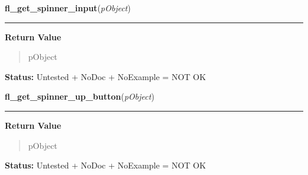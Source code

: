 \hspace{.8\funcindent}\begin{boxedminipage}{\funcwidth}

    \raggedright \textbf{fl\_get\_spinner\_input}(\textit{pObject})

    \vspace{-1.5ex}

    \rule{\textwidth}{0.5\fboxrule}
\setlength{\parskip}{2ex}
\setlength{\parskip}{1ex}
      \textbf{Return Value}
    \vspace{-1ex}

      \begin{quote}
      pObject

      \end{quote}

\textbf{Status:} Untested + NoDoc + NoExample = NOT OK



    \end{boxedminipage}

    \label{xformslib:library:fl_get_spinner_up_button}

    \vspace{0.5ex}

\hspace{.8\funcindent}\begin{boxedminipage}{\funcwidth}

    \raggedright \textbf{fl\_get\_spinner\_up\_button}(\textit{pObject})

    \vspace{-1.5ex}

    \rule{\textwidth}{0.5\fboxrule}
\setlength{\parskip}{2ex}
\setlength{\parskip}{1ex}
      \textbf{Return Value}
    \vspace{-1ex}

      \begin{quote}
      pObject

      \end{quote}

\textbf{Status:} Untested + NoDoc + NoExample = NOT OK



    \end{boxedminipage}

    \label{xformslib:library:fl_get_spinner_down_button}

